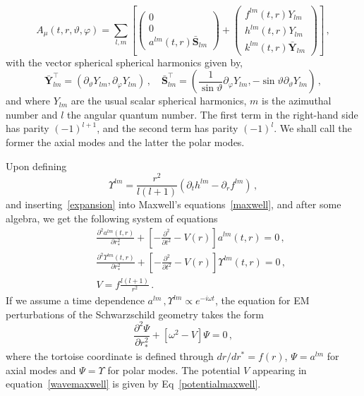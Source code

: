 \documentclass[11pt]{article}
\newcommand{\be}{\begin{equation}}
\newcommand{\ee}{\end{equation}}
\def\beq{\begin{eqnarray}}
\def\eeq{\end{eqnarray}}
\numberwithin{equation}{section} %
\begin{document}
{\small
\be
A_{\mu}(t,r,\vartheta,\varphi)=\sum_{l,m}\left[\left(
 \begin{array}{c} 0 \\ 0 \\
 a^{lm}(t,r)\bar{\bm{S}}_{lm}\end{array}\right)
+\left(\begin{array}{c}f^{lm}(t,r)Y_{lm}\\h^{lm}(t,r)Y_{lm} \\
 k^{lm}(t,r) \bar{\bm{Y}}_{lm}\end{array}\right)\right]\,,
\label{expansion}
\ee
}
%
with the vector spherical spherical harmonics given by,
%
\be
\bar{\bm{Y}}^\intercal_{lm}=\left(\partial_\vartheta Y_{lm}, \partial_\varphi Y_{lm}\right)\,,\quad
\bar{\bm{S}}^\intercal_{lm}=\left(\frac{1}{\sin\vartheta}\partial_\varphi Y_{lm}, -\sin\vartheta\partial_\vartheta Y_{lm}\right)\,,
\ee
%
and where $Y_{lm}$ are the usual scalar spherical harmonics, $m$ is the azimuthal number and $l$ the angular quantum number. The first term in the right-hand side has parity $(-1)^{l+1}$,
and the second term has parity $(-1)^{l}$. We shall call the former the axial modes and the latter the polar modes. 

Upon defining
%
\be 
\Upsilon^{lm}=\frac{r^2}{l(l+1)}\left(\partial_t h^{lm}-\partial_r f^{lm}\right)\,,\label{upsilon}
\ee
%
and inserting~\eqref{expansion} into Maxwell's equations~\eqref{maxwell}, and after some algebra, we get the following system of equations
%
\beq
& & \frac{\partial^{2} a^{lm}(t,r)}{\partial r_*^{2}} + \left\lbrack -\frac{\partial^{2}}{\partial
t^{2}}-V(r)\right\rbrack a^{lm}(t,r)=0 \,,\\
& &\frac{\partial^{2}\Upsilon^{lm}(t,r)}{\partial r_*^{2}} + \left\lbrack -\frac{\partial^{2}}{\partial
t^{2}}-V(r)\right\rbrack \Upsilon^{lm}(t,r)=0 \,,\\
& & V=f\frac{l(l+1)}{r^2}\,.\label{potentialmaxwell}
\eeq
If we assume a time dependence $a^{lm}\,,\Upsilon^{lm}\propto e^{-i\omega t}$, the equation for
EM perturbations of the Schwarzschild geometry takes the form
%
\be
\frac{\partial^{2}\Psi}{\partial r_*^{2}} + \left\lbrack \omega^2-V\right\rbrack \Psi=0
\,,\label{wavemaxwell}
\ee
%
where the tortoise coordinate is defined through $dr/dr^*=f(r)$, $\Psi=a^{lm}$ for axial modes and $\Psi=\Upsilon$ for polar modes. The
potential $V$ appearing in equation~\eqref{wavemaxwell} is given by Eq~\eqref{potentialmaxwell}.
\end{document}
